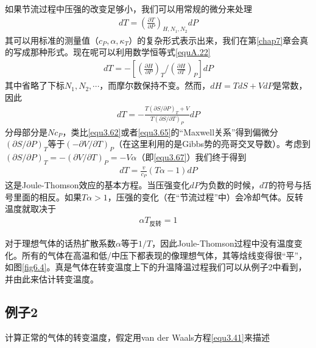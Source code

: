 如果节流过程中压强的改变足够小，我们可以用常规的微分来处理
\begin{align}\label{equ6.38}
dT=\left(\frac{\partial T}{\partial P}\right)_{H, N_1, N_2}dP
\end{align}
其可以用标准的测量值（$c_P, \alpha, \kappa_T$）的复杂形式表示出来，我们在第\ref{chap7}章会真的写成那种形式。现在呢可以利用数学恒等式\eqref{equA.22}
\begin{align}\label{equ6.39}
dT=-\left[\left(\frac{\partial H}{\partial P}\right)_T/\left(\frac{\partial H}{\partial T}\right)_P\right]dP
\end{align}
其中省略了下标$N_1, N_2,\cdots$，而摩尔数保持不变。然而，$dH=TdS+VdP$是常数，因此
\begin{align}\label{equ6.40}
dT=-\frac{T(\partial S/\partial P)_T+V}{T(\partial S/\partial T)_P}dP
\end{align}
分母部分是$Nc_P$，类比\eqref{equ3.62}或者\eqref{equ3.65}的“Maxwell关系”得到偏微分$(\partial S/\partial P)_T$等于$(-\partial V/\partial T)_P$（在这里利用的是Gibbs势的亮哥交叉导数）。考虑到$(\partial S/\partial P)_T=-(\partial V/\partial T)_P=-V\alpha$（即\eqref{equ3.67}）我们终于得到
\begin{align}\label{equ6.41}
dT=\frac{v}{c_P}(T\alpha-1)dP
\end{align}
这是Joule-Thomson效应的基本方程。当压强变化$dP$为负数的时候，$dT$的符号与括号里面的相反。如果$T\alpha>1$，压强的变化（在“节流过程”中）会冷却气体。反转温度就取决于
\begin{align}\label{equ6.42}
\alpha T_{\text{反转}} = 1
\end{align}

对于理想气体的话热扩散系数$\alpha$等于$1/T$，因此Joule-Thomson过程中没有温度变化。所有的气体在高温和低/中压下都表现的像理想气体，其等焓线变得很“平”，如图\ref{fig6.4}。真是气体在转变温度上下的升温降温过程我们可以从例子2中看到，并由此来估计转变温度。

\subsection*{例子2}
计算正常的气体的转变温度，假定用van der Waals方程\eqref{equ3.41}来描述
